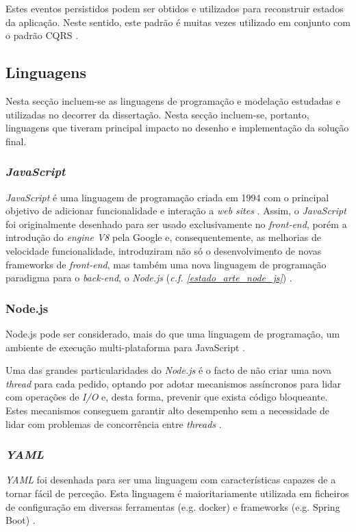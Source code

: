 Estes eventos persistidos podem ser obtidos e utilizados para reconstruir estados da aplicação. Neste sentido, este padrão é muitas vezes utilizado em conjunto com o padrão CQRS \cite{event_sourcing}.

\subsection{Linguagens}
Nesta secção incluem-se as linguagens de programação e modelação estudadas e utilizadas no decorrer da dissertação. Nesta secção incluem-se, portanto, linguagens que tiveram principal impacto no desenho e implementação da solução final.

\subsubsection{\emph{JavaScript} \label{estado_arte_javascript}}

\emph{JavaScript} é uma linguagem de programação criada em 1994 com o principal objetivo de adicionar funcionalidade e interação a \emph{web sites} \cite{javascript}. Assim, o \emph{JavaScript} foi originalmente desenhado para ser usado exclusivamente no \emph{front-end}, porém a introdução do \emph{engine V8} pela Google e, consequentemente, as melhorias de velocidade funcionalidade, introduziram não só o desenvolvimento de novas frameworks de \emph{front-end}, mas também uma nova linguagem de programação paradigma para o \emph{back-end}, o \emph{Node.js} (\emph{c.f. \ref{estado_arte_node_js}}) \cite{javascript_everywhere}.

\subsubsection{Node.js \label{estado_arte_node_js}}
Node.js pode ser considerado, mais do que uma linguagem de programação, um ambiente de execução multi-plataforma para JavaScript \cite{node_js}.

Uma das grandes particularidades do \emph{Node.js} é o facto de não criar uma nova \emph{thread} para cada pedido, optando por adotar mecanismos assíncronos para lidar com operações de \emph{I/O} e, desta forma, prevenir que exista código bloqueante. Estes mecanismos conseguem garantir alto desempenho sem a necessidade de lidar com problemas de concorrência entre \emph{threads} \cite{node_js}.

\subsubsection{\emph{\acrfull{YAML}}}
\emph{\acrshort{YAML}} foi desenhada para ser uma linguagem com características capazes de a tornar fácil de perceção. Esta linguagem é maioritariamente utilizada em ficheiros de configuração em diversas ferramentas (e.g. docker) e frameworks (e.g. Spring Boot) \cite{yaml}.

